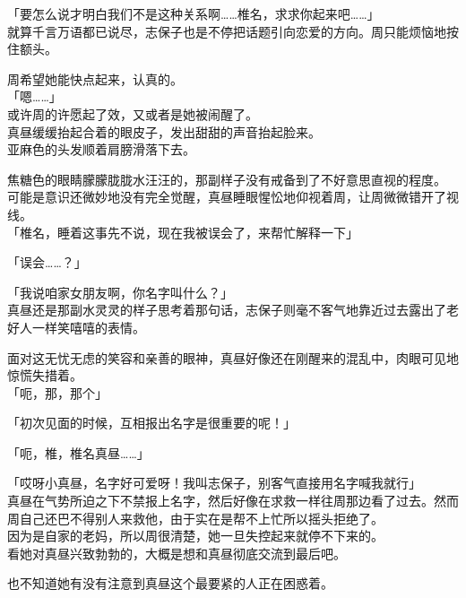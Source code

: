 「要怎么说才明白我们不是这种关系啊……椎名，求求你起来吧……」\\

就算千言万语都已说尽，志保子也是不停把话题引向恋爱的方向。周只能烦恼地按住额头。

周希望她能快点起来，认真的。\\

「嗯……」\\

或许周的许愿起了效，又或者是她被闹醒了。\\

真昼缓缓抬起合着的眼皮子，发出甜甜的声音抬起脸来。\\

亚麻色的头发顺着肩膀滑落下去。

焦糖色的眼睛朦朦胧胧水汪汪的，那副样子没有戒备到了不好意思直视的程度。\\

可能是意识还微妙地没有完全觉醒，真昼睡眼惺忪地仰视着周，让周微微错开了视线。\\

「椎名，睡着这事先不说，现在我被误会了，来帮忙解释一下」

「误会……？」

「我说咱家女朋友啊，你名字叫什么？」\\

真昼还是那副水灵灵的样子思考着那句话，志保子则毫不客气地靠近过去露出了老好人一样笑嘻嘻的表情。

面对这无忧无虑的笑容和亲善的眼神，真昼好像还在刚醒来的混乱中，肉眼可见地惊慌失措着。\\

「呃，那，那个」

「初次见面的时候，互相报出名字是很重要的呢！」

「呃，椎，椎名真昼……」

「哎呀小真昼，名字好可爱呀！我叫志保子，别客气直接用名字喊我就行」\\

真昼在气势所迫之下不禁报上名字，然后好像在求救一样往周那边看了过去。然而周自己还巴不得别人来救他，由于实在是帮不上忙所以摇头拒绝了。\\

因为是自家的老妈，所以周很清楚，她一旦失控起来就停不下来的。\\

看她对真昼兴致勃勃的，大概是想和真昼彻底交流到最后吧。

也不知道她有没有注意到真昼这个最要紧的人正在困惑着。\\

